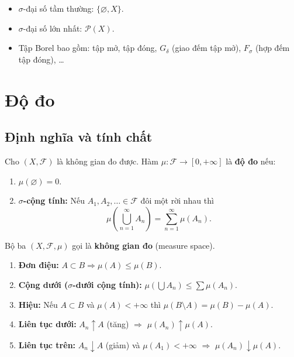 \documentclass[12pt,a4paper]{article}
\begin{document}
\begin{vidu}
  \begin{itemize}
    \item $\sigma$-đại số tầm thường: $\{\varnothing, X\}$.
    \item $\sigma$-đại số lớn nhất: $\mathcal{P}(X)$.
    \item Tập Borel bao gồm: tập mở, tập đóng, $G_\delta$ (giao đếm tập mở), $F_\sigma$ (hợp đếm tập đóng), \ldots
  \end{itemize}
\end{vidu}

\section{Độ đo}

\subsection{Định nghĩa và tính chất}

\begin{dinhnghia}
  Cho $(X, \mathcal{F})$ là không gian đo được. Hàm $\mu: \mathcal{F} \to [0, +\infty]$ là \textbf{độ đo} nếu:
  \begin{enumerate}
    \item $\mu(\varnothing) = 0$.
    \item \textbf{$\sigma$-cộng tính:} Nếu $A_1, A_2, \ldots \in \mathcal{F}$ đôi một rời nhau thì
      \[
        \mu\!\left(\bigcup_{n=1}^{\infty} A_n\right) = \sum_{n=1}^{\infty} \mu(A_n).
      \]
  \end{enumerate}
  Bộ ba $(X, \mathcal{F}, \mu)$ gọi là \textbf{không gian đo} (measure space).
\end{dinhnghia}

\begin{tinhchat}
  \begin{enumerate}
    \item \textbf{Đơn điệu:} $A \subset B \Rightarrow \mu(A) \le \mu(B)$.
    \item \textbf{Cộng dưới ($\sigma$-dưới cộng tính):} $\mu\!\left(\bigcup A_n\right) \le \sum \mu(A_n)$.
    \item \textbf{Hiệu:} Nếu $A \subset B$ và $\mu(A) < +\infty$ thì $\mu(B \setminus A) = \mu(B) - \mu(A)$.
    \item \textbf{Liên tục dưới:} $A_n \uparrow A$ (tăng) $\Rightarrow$ $\mu(A_n) \uparrow \mu(A)$.
    \item \textbf{Liên tục trên:} $A_n \downarrow A$ (giảm) và $\mu(A_1) < +\infty$ $\Rightarrow$ $\mu(A_n) \downarrow \mu(A)$.
  \end{enumerate}
\end{tinhchat}
\end{document}
